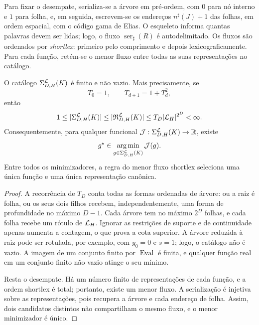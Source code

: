 Para fixar o desempate, serializa-se a árvore em pré-ordem, com $0$ para nó
interno e $1$ para folha, e, em seguida, escrevem-se os endereços
$n^\sharp(J)+1$ das folhas, em ordem espacial, com o código gama de Elias. O
esqueleto informa quantas palavras devem ser lidas; logo, o fluxo
$\operatorname{ser}_\sharp(R)$ é autodelimitado. Os fluxos são ordenados por
\emph{shortlex}: primeiro pelo comprimento e depois lexicograficamente. Para
cada função, retém-se o menor fluxo entre todas as suas representações no
catálogo.

\begin{theorem}\label{map:artigo_2:3.23}
\label{artigo_2:thm:finite-catalog-minimizer}
O catálogo $\Sigma_{D,H}^{\mathcal{L}}(K)$ é finito e não vazio. Mais
precisamente, se
\[
 T_0=1,\qquad T_{d+1}=1+T_d^2,
\]
então
\begin{equation}
 1\le |\Sigma_{D,H}^{\mathcal{L}}(K)|
 \le |\mathfrak R_{D,H}^{\mathcal{L}}(K)|
 \le T_D|\mathcal{L}_H|^{2^D}<\infty.
 \label{artigo_2:eq:finite-catalog-bound}
\end{equation}
Consequentemente, para qualquer funcional
$\mathcal J:\Sigma_{D,H}^{\mathcal{L}}(K)\to\mathbb R$, existe
\begin{equation}
 g^\star\in\operatorname*{arg\,min}_{g\in\Sigma_{D,H}^{\mathcal{L}}(K)}\mathcal J(g).
 \label{artigo_2:eq:finite-argmin}
\end{equation}
Entre todos os minimizadores, a regra do menor fluxo shortlex seleciona uma
única função e uma única representação canônica.
\end{theorem}

\begin{proof}
A recorrência de $T_D$ conta todas as formas ordenadas de árvore: ou a raiz é
folha, ou os seus dois filhos recebem, independentemente, uma forma de profundidade
no máximo $D-1$. Cada árvore tem no máximo $2^D$ folhas, e cada folha recebe
um rótulo de $\mathcal{L}_H$. Ignorar as restrições de suporte e de continuidade
apenas aumenta a contagem, o que prova a cota superior. A árvore reduzida à raiz pode
ser rotulada, por exemplo, com $y_0=0$ e $s=1$; logo, o catálogo não é vazio.
A imagem de um conjunto finito por $\operatorname{Eval}$ é finita, e qualquer
função real em um conjunto finito não vazio atinge o seu mínimo.

Resta o desempate. Há um número finito de representações de cada função, e a
ordem shortlex é total; portanto, existe um menor fluxo. A serialização é
injetiva sobre as representações, pois recupera a árvore e cada endereço de
folha. Assim, dois candidatos distintos não compartilham o mesmo fluxo, e o
menor minimizador é único.
\end{proof}

